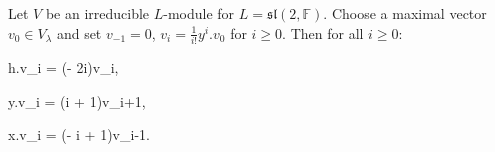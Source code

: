Let $V$ be an irreducible $L$-module for $L = \mathfrak{sl}(2, \mathbb{F})$. Choose a maximal vector $v_0 \in V_\lambda$ and set $v_{-1} = 0$, $v_i = \frac{1}{i!} y^i.v_0$ for $i \geq 0$. Then for all $i \geq 0$:

 \quad h.v_i = (\lambda - 2i)v_i,

 \quad y.v_i = (i + 1)v_{i+1},

 \quad x.v_i = (\lambda - i + 1)v_{i-1}.
